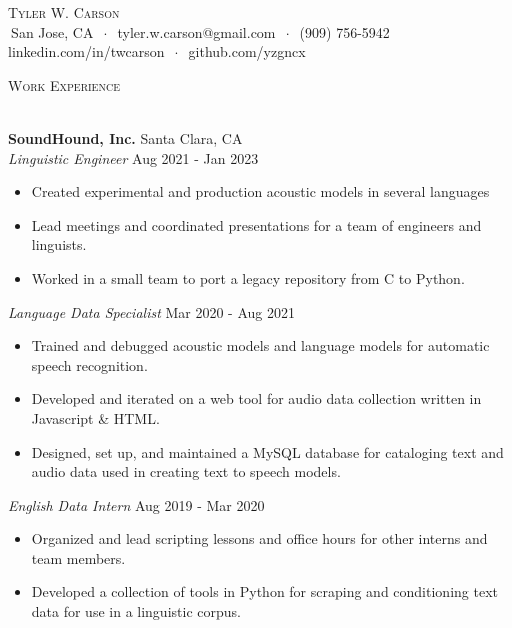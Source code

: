 \documentclass[]{article}
\newcommand{\lineunder} {
    \vspace*{-8pt} \\
    \hspace*{-18pt} \hrulefill \\
}
\newcommand{\header} [1] {
    {\hspace*{-18pt}\vspace*{6pt} \textsc{#1}}
    \vspace*{-6pt} \lineunder
}
\begin{document}
\vspace*{-40pt}


\vspace*{-10pt}
\begin{center}
	{\Huge \scshape {Tyler W. Carson}}\\
	$\ $San Jose, CA $\ \cdot\ $ tyler.w.carson@gmail.com $\ \cdot\ $ (909) 756-5942\\ linkedin.com/in/twcarson $\ \cdot\ $ github.com/yzgncx\\
\end{center}


\header{Work Experience}
\vspace{1mm}

\textbf{SoundHound, Inc.} \hfill Santa Clara, CA\\
\textit{Linguistic Engineer} \hfill Aug 2021 - Jan 2023\\
\vspace{-3mm}
\begin{itemize} \itemsep 0pt
	\item Created experimental and production acoustic models in several languages
	\item Lead meetings and coordinated presentations for a team of engineers and linguists.
	\item Worked in a small team to port a legacy repository from C to Python. 
\end{itemize}
\textit{Language Data Specialist} \hfill Mar 2020 - Aug 2021\\
\vspace{-3mm}
\begin{itemize} \itemsep 0pt
	\item Trained and debugged acoustic models and language models for automatic speech recognition. 
	\item Developed and iterated on a web tool for audio data collection written in Javascript \& HTML.
	\item Designed, set up, and maintained a MySQL database for cataloging text and audio data used in creating text to speech models.
\end{itemize}
\textit{English Data Intern} \hfill Aug 2019 - Mar 2020\\
\vspace{-3mm}
\begin{itemize} \itemsep 0pt
	\item Organized and lead scripting lessons and office hours for other interns and team members.
	\item Developed a collection of tools in Python for scraping and conditioning text data for use in a linguistic corpus.
\end{itemize}
\vspace{1mm}
\end{document}
